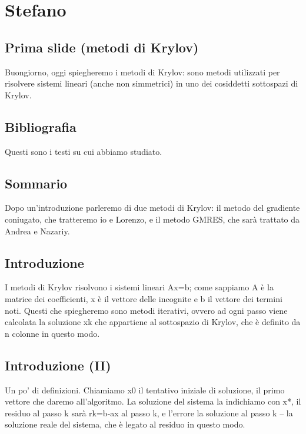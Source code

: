 \documentclass[a4paper]{article}
\begin{document}
\maketitle

\section*{Stefano}
\subsection*{Prima slide (metodi di Krylov)}
Buongiorno, oggi spiegheremo i metodi di Krylov: sono metodi utilizzati per risolvere sistemi lineari (anche non simmetrici) in uno dei cosiddetti sottospazi di Krylov.

\subsection*{Bibliografia}
Questi sono i testi su cui abbiamo studiato.

\subsection*{Sommario}
Dopo un’introduzione parleremo di due metodi di Krylov: il metodo del gradiente coniugato, che tratteremo io e Lorenzo, e il metodo GMRES, che sarà trattato da Andrea e Nazariy. 

\subsection*{Introduzione}
I metodi di Krylov risolvono i sistemi lineari Ax=b; come sappiamo A è la matrice dei coefficienti, x è il vettore delle incognite e b il vettore dei termini noti. Questi che spiegheremo sono metodi iterativi, ovvero ad ogni passo viene calcolata la soluzione xk che appartiene al sottospazio di Krylov, che è definito da n colonne in questo modo. 

\subsection*{Introduzione (II)}
Un po’ di definizioni. Chiamiamo x0 il tentativo iniziale di soluzione, il primo vettore che daremo all’algoritmo. La soluzione del sistema la indichiamo con x*, il residuo al passo k sarà rk=b-ax al passo k, e l’errore la soluzione al passo k – la soluzione reale del sistema, che è legato al residuo in questo modo.
\end{document}
